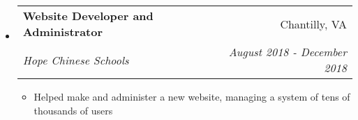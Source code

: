 \documentclass[letterpaper,11pt]{article}
\makeatletter
\newcommand{\resitem}[1]{\item #1 \vspace{-2pt}}
\newcommand{\ressubheading}[4]{
\begin{tabular*}{7.0in}{l@{\extracolsep{\fill}}r}
		\textbf{#1} & #2 \\
		\textit{#3} & \textit{#4} \\
\end{tabular*}\vspace{-6pt}}
\makeatother
\begin{document}
\begin{itemize}
\begin{itemize}
	\end{itemize}
\item
    \ressubheading{Website Developer and Administrator}{Chantilly, VA}{Hope Chinese Schools}{August 2018 - December 2018}
	\begin{itemize}
	    \resitem{Helped make and administer a new website, managing a system of tens of thousands of users}
	\end{itemize}
\end{itemize}
\end{document}
